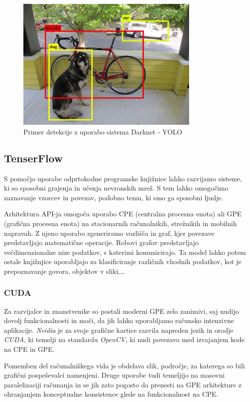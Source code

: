 \documentclass[runningheads,a4paper]{llncs}
\begin{document}
\begin{figure}[H]
\centering
\includegraphics[width=90mm]{figures/darknetExample.png}
\caption{Primer detekcije z uporabo sistema Darknet - YOLO}
\label{fig:darknetExample}
\end{figure}

\subsection{TenserFlow}
S pomočjo uporabe odprtokodne programske knjižnice lahko razvijamo sisteme, ki so sposobni grajenja in učenja nevronskih mrež. S tem lahko omogočimo zaznavanje vzorcev in povezav, podobno temu, ki smo ga sposobni ljudje.

Arhitektura API-ja omogoča uporabo CPE (centralna procesna enota) ali GPE (grafična procesna enota) na stacionarnih računalnikih, strežnikih in mobilnih napravah. Z njeno uporabo zgeneriramo vozlišča in graf, kjer povezave predstavljajo matematične operacije. Robovi grafov predstavljajo večdimenzionalne nize podatkov, s katerimi komunicirajo. Ta model lahko potem ostale knjižnjice uporabljajo za klasificiranje različnih vhodnih podatkov, kot je prepoznavanje govora, objektov v sliki,…

\subsubsection{CUDA}
Za razvijalce in znanstvenike so postali moderni GPE zelo zanimivi, saj nudijo dovolj funkcionalnosti in moči, da jih lahko uporabljamo računsko intenzivne aplikacije. \textit{Nvidia} je za svoje grafične kartice razvila napreden jezik in orodje \textit{CUDA}, ki temelji na standardu \textit{OpenCV}, ki nudi povezavo med izvajanjem kode na CPE in GPE.

Pomemben del računalniškega vida je obdelava slik, področje, za katerega so bili grafični pospeševalci namenjeni. Druge uporabe tudi temeljijo na masovni paralelizaciji računanja in se jih zato pogosto da prenesti na GPE arhitekture z ohranjanjem konceptualne konsistence glede na funkcionalnost na CPE.
\end{document}
